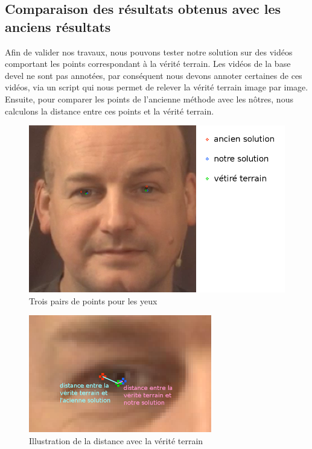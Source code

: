 \newpage

\subsection{Comparaison des résultats obtenus avec les anciens résultats}
Afin de valider nos travaux, nous pouvons tester notre solution sur des vidéos comportant les points correspondant à 
la vérité terrain. Les vidéos de la base devel ne sont pas annotées, par conséquent nous devons annoter certaines de 
ces vidéos, via un script qui nous permet de relever la vérité terrain image par image. Ensuite, pour comparer les points 
de l'ancienne méthode avec les nôtres, nous calculons la distance entre ces points et la vérité terrain.\\

\begin{figure}[H]
  \centering
  \includegraphics[width=13cm]{image/visage_6points.png}
  \caption{Trois pairs de points pour les yeux}
\end{figure}

\begin{figure}[H]
  \centering
  \includegraphics[width=8cm]{image/eye_3points.png}
  \caption{Illustration de la distance avec la vérité terrain}
\end{figure}


